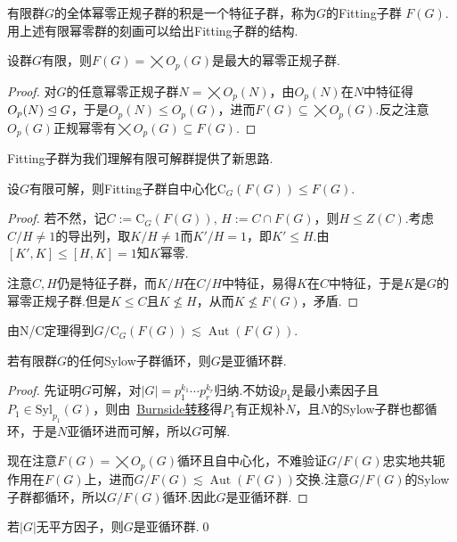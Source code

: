 有限群$G$的全体幂零正规子群的积是一个特征子群，称为$G$的{\heiti Fitting子群} $F(G)$.用上述有限幂零群的刻画可以给出Fitting子群的结构.
\begin{prop}
	设群$G$有限，则$F(G)=\bigtimes O_p(G)$是最大的幂零正规子群.\hypertarget{prop:FittingSubgrp}{}
\end{prop}
\begin{proof}
	对$G$的任意幂零正规子群$N=\bigtimes O_p(N)$，由$O_p(N)$在$N$中特征得$O_p(N)\trianglelefteq G$，于是$O_p(N)\le O_p(G)$，进而$F(G)\subseteq\bigtimes O_p(G)$.反之注意$O_p(G)$正规幂零有$\bigtimes O_p(G)\subseteq F(G)$.
\end{proof}

Fitting子群为我们理解有限可解群提供了新思路.
\begin{prop}
	设$G$有限可解，则Fitting子群自中心化$\mathrm{C}_G(F(G))\le F(G)$.
\end{prop}
\begin{proof}
	若不然，记$C:=\mathrm{C}_G(F(G)),\,H:=C\cap F(G)$，则$H\le Z(C)$.考虑$C/H\ne 1$的导出列，取$K/H\ne 1$而$K'/H=1$，即$K'\le H$.由$[K',K]\le[H,K]=1$知$K$幂零.

	注意$C,H$仍是特征子群，而$K/H$在$C/H$中特征，易得$K$在$C$中特征，于是$K$是$G$的幂零正规子群.但是$K\le C$且$K\nleq H$，从而$K\nleq F(G)$，矛盾.
\end{proof}
\begin{remark}
	由N/C定理得到$G/\mathrm{C}_G(F(G))\lesssim\operatorname*{Aut}(F(G))$.
\end{remark}
\begin{thm}
	若有限群$G$的任何Sylow子群循环，则$G$是亚循环群.\hypertarget{thm:CyclicSylowMetacyclic}{}
\end{thm}
\begin{proof}
	先证明$G$可解，对$|G|=p_1^{k_1}\cdots p_r^{k_r}$归纳.不妨设$p_1$是最小素因子且$P_1\in\mathrm{Syl}_{p_1}(G)$，则由~\hyperlink{thm:BurnsideNormalpComplement}{Burnside转移}得$P_1$有正规补$N$，且$N$的Sylow子群也都循环，于是$N$亚循环进而可解，所以$G$可解.

	现在注意$F(G)=\bigtimes O_p(G)$循环且自中心化，不难验证$G/F(G)$忠实地共轭作用在$F(G)$上，进而$G/F(G)\lesssim\operatorname*{Aut}(F(G))$交换.注意$G/F(G)$的Sylow子群都循环，所以$G/F(G)$循环.因此$G$是亚循环群.
\end{proof}
\begin{cor*}
	若$|G|$无平方因子，则$G$是亚循环群.\qed
\end{cor*}

